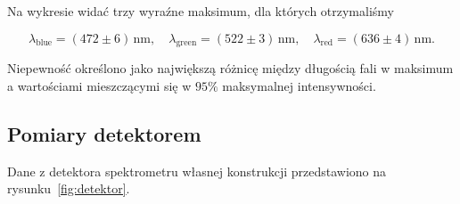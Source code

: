 \documentclass[12pt]{article}
\begin{document}
Na wykresie widać trzy wyraźne maksimum, dla których otrzymaliśmy  

\[
  \lambda_{\mathrm{blue}} = (472 \pm 6)\,\mathrm{nm}, \quad
  \lambda_{\mathrm{green}} = (522 \pm 3)\,\mathrm{nm}, \quad
  \lambda_{\mathrm{red}}  = (636 \pm 4)\,\mathrm{nm}.
\]

Niepewność określono jako największą różnicę między długością fali w maksimum a wartościami mieszczącymi się w \(95\%\) maksymalnej intensywności.

\subsection*{Pomiary detektorem}

Dane z detektora spektrometru własnej konstrukcji przedstawiono na rysunku~\ref{fig:detektor}.
\end{document}
